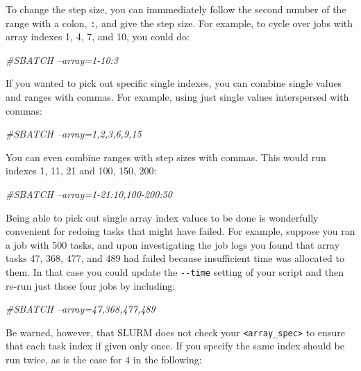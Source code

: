 \documentclass[]{krantz}
\makeatletter
\newenvironment{Shaded}{\begin{snugshade}}{\end{snugshade}}
\newcommand{\CommentTok}[1]{\textcolor[rgb]{0.37,0.37,0.37}{\textit{#1}}}
\newenvironment{kframe}{%
\medskip{}
\setlength{\fboxsep}{.8em}
 \def\at@end@of@kframe{}%
 \ifinner\ifhmode%
  \def\at@end@of@kframe{\end{minipage}}%
  \begin{minipage}{\columnwidth}%
 \fi\fi%
 \def\FrameCommand##1{\hskip\@totalleftmargin \hskip-\fboxsep
 \colorbox{shadecolor}{##1}\hskip-\fboxsep
     \hskip-\linewidth \hskip-\@totalleftmargin \hskip\columnwidth}%
 \MakeFramed {\advance\hsize-\width
   \@totalleftmargin\z@ \linewidth\hsize
   \@setminipage}}%
 {\par\unskip\endMakeFramed%
 \at@end@of@kframe}
\renewenvironment{Shaded}{\begin{kframe}}{\end{kframe}}
\makeatother
\begin{document}
To change the step size, you can immmediately follow the second number of the range
with a colon, \texttt{:}, and give the step size. For example, to cycle over jobs with
array indexes 1, 4, 7, and 10, you could do:

\begin{Shaded}
\begin{Highlighting}[]
\CommentTok{#SBATCH --array=1-10:3}
\end{Highlighting}
\end{Shaded}

If you wanted to pick out specific single indexes, you can combine single
values and ranges with commas. For example, using just single values
interspersed with commas:

\begin{Shaded}
\begin{Highlighting}[]
\CommentTok{#SBATCH --array=1,2,3,6,9,15}
\end{Highlighting}
\end{Shaded}

You can even combine ranges with step sizes with commas. This would run
indexes 1, 11, 21 and 100, 150, 200:

\begin{Shaded}
\begin{Highlighting}[]
\CommentTok{#SBATCH --array=1-21:10,100-200:50}
\end{Highlighting}
\end{Shaded}

Being able to pick out single array index values to be done is wonderfully
convenient for redoing tasks that might have failed. For example, suppose you
ran a job with 500 tasks, and upon investigating the job logs you found that
array tasks 47, 368, 477, and 489 had failed because insufficient time was
allocated to them. In that case you could update the \texttt{-\/-time} setting of your
script and then re-run just those four jobs by including:

\begin{Shaded}
\begin{Highlighting}[]
\CommentTok{#SBATCH --array=47,368,477,489}
\end{Highlighting}
\end{Shaded}

Be warned, however, that SLURM does not check your \texttt{\textless{}array\_spec\textgreater{}} to ensure that
each task index if given only once. If you specify the same index should be run
twice, as is the case for 4 in the following:
\end{document}
